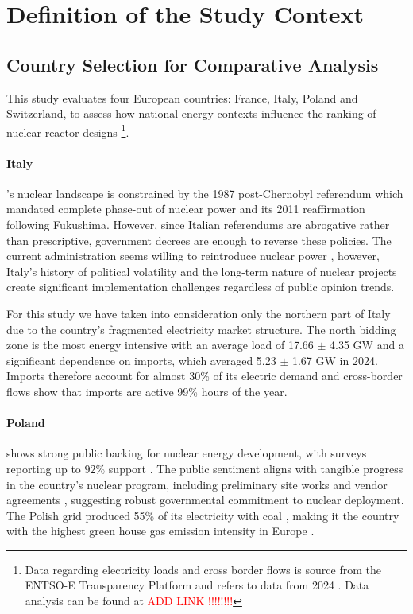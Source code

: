 \section{Definition of the Study Context}
\subsection{Country Selection for Comparative Analysis}
This study evaluates four European countries: France, Italy, Poland and Switzerland, to assess how national energy contexts influence the ranking of nuclear reactor designs \footnote{Data regarding electricity loads and cross border flows is source from the ENTSO-E Transparency Platform and refers to data from 2024 \cite{ENTSOE_Transparency_2025}. Data analysis can be found at \textcolor{red}{ADD LINK !!!!!!!!}}.

\paragraph{Italy}'s nuclear landscape is constrained by the 1987 post-Chernobyl referendum which mandated complete phase-out of nuclear power and its 2011 reaffirmation following Fukushima. However, since Italian referendums are abrogative rather than prescriptive, government decrees are enough to reverse these policies. The current administration seems willing to reintroduce nuclear power \cite{Sole24Ore_Italy_Nuclear_Strategy_2024}, however, Italy's history of political volatility and the long-term nature of nuclear projects create significant implementation challenges regardless of public opinion trends. 

For this study we have taken into consideration only the northern part of Italy due to the country's fragmented electricity market structure. The north bidding zone is the most energy intensive with an average load of 17.66 $\pm$ 4.35 GW and a significant dependence on imports, which averaged 5.23 $\pm$ 1.67 GW in 2024. Imports therefore account for almost 30\% of its electric demand and cross-border flows show that imports are active 99\% hours of the year. 

\paragraph{Poland} shows strong public backing for nuclear energy development, with surveys reporting up to $92\%$ support \cite{NucNet_Poland_Nuclear_Support_2024}. The public sentiment aligns with tangible progress in the country's nuclear program, including preliminary site works and vendor agreements \cite{Westinghouse_Poland_Nuclear_2025,WorldNuclearNews_Poland_Preliminary_Works_2025}, suggesting robust governmental commitment to nuclear deployment. The Polish grid produced 55\% of its electricity with coal \cite{IEA_Electricity_2024}, making it the country with the highest green house gas emission intensity in Europe \cite{ElectricityMaps_CarbonIntensity_2024}.


